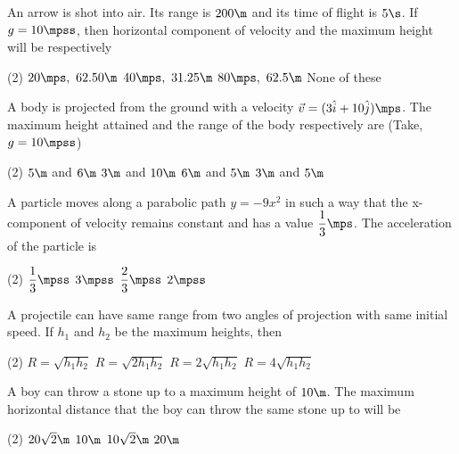 \item An arrow is shot into air. Its range is $200\m$ and its time of flight is $5\s$. If $g=10\mpss$, then horizontal component of velocity and the maximum height will be respectively
\begin{tasks}(2)   
    \task $20\mps, ~ 62.50\m$
    \task $40\mps, ~ 31.25\m$\ans
    \task $80\mps, ~ 62.5\m$
    \task None of these
\end{tasks}

\item A body is projected from the ground with a velocity $\Vec{v}=(3\hat{i}+10\hat{j})\mps$. The maximum height attained and the range of the body respectively are (Take, $g=10\mpss$)
\begin{tasks}(2)
    \task $5\m$ and $6\m$\ans
    \task $3\m$ and $10\m$
    \task $6\m$ and $5\m$
    \task $3\m$ and $5\m$
\end{tasks}

\item A particle moves along a parabolic path $y=-9x^2$ in such a way that the x-component of velocity remains constant and has a value $\dfrac{1}{3}\mps$. The acceleration of the particle is
\begin{tasks}(2)
    \task $\dfrac{1}{3}\mpss$
    \task $3\mpss$
    \task $\dfrac{2}{3}\mpss$
    \task $2\mpss$\ans
\end{tasks}

\item A projectile can have same range from two angles of projection with same initial speed. If $h_1$ and $h_2$ be the maximum heights, then
\begin{tasks}(2)
    \task $R=\sqrt{h_1h_2}$
    \task $R=\sqrt{2h_1h_2}$
    \task $R=2\sqrt{h_1h_2}$
    \task $R=4\sqrt{h_1h_2}$\ans
\end{tasks}

\item A boy can throw a stone up to a maximum height of $10\m$. The maximum horizontal distance that the boy can throw the same stone up to will be
\begin{tasks}(2)
    \task $20\sqrt{2}\m$
    \task $10\m$
    \task $10\sqrt{2}\m$
    \task $20\m$\ans
\end{tasks}